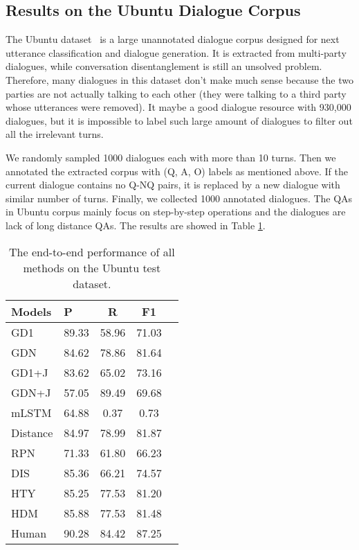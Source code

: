 \subsection{Results on the Ubuntu Dialogue Corpus}
\label{sec:uresults}

The Ubuntu dataset~\cite{lowe2015ubuntu} is a large unannotated dialogue corpus designed for next utterance classification and dialogue generation. It is extracted from multi-party dialogues, while conversation disentanglement is still an unsolved problem. 
Therefore, many dialogues in this dataset don't make much 
sense because the two parties are not actually talking to each other (they were
talking to a third party whose utterances were removed). 
It maybe a good dialogue resource with 930,000 dialogues, but it is 
impossible to label such large amount of dialogues to filter out all
the irrelevant turns.

We randomly sampled 1000 dialogues each with more than 10 turns. 
Then we annotated the extracted corpus with (Q, A, O) labels as mentioned above. 
If the current dialogue contains no Q-NQ pairs, it is replaced by a new dialogue 
with similar number of turns. Finally, we collected 1000 annotated dialogues. 
The QAs in Ubuntu corpus mainly focus on step-by-step operations and the dialogues are 
lack of long distance QAs. The results are showed in Table \ref{tab:mainResults-ubuntu}.

\begin{table}

	\centering
	\begin{tabular}{p{1cm}<{\centering}p{1cm}<{\centering}ccc}
		\toprule[1.5pt]
		Models &P&R& F1\\
		\midrule[1pt]
		GD1&89.33&58.96&71.03\\
		GDN  &84.62&78.86&81.64\\
		GD1+J&83.62&65.02&73.16\\
		GDN+J&57.05&89.49&69.68\\
		\hline
		mLSTM&64.88&0.37&0.73\\
		Distance&84.97&78.99&81.87\\
		RPN&71.33&61.80&66.23\\
		\hline
		DIS&85.36&66.21&74.57\\
		HTY&85.25&77.53&81.20\\
		HDM&85.88&77.53&81.48\\
		\hline
		Human &90.28&84.42&87.25\\
		\bottomrule[1.5pt]
	\end{tabular}
	\vspace{-0.25cm}
	\caption{The end-to-end performance of all methods on the Ubuntu test dataset.}
	\label{tab:mainResults-ubuntu}
\end{table}

